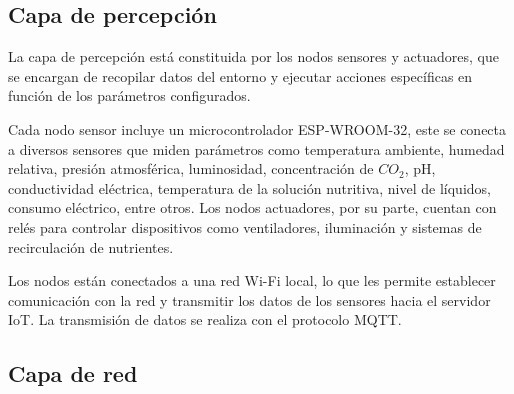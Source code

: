 
\subsection{Capa de percepción}

La capa de percepción está constituida por los nodos sensores y actuadores, que
se encargan de recopilar datos del entorno y ejecutar acciones específicas en
función de los parámetros configurados.

Cada nodo sensor incluye un microcontrolador ESP-WROOM-32, este se conecta a
diversos sensores que miden parámetros como temperatura ambiente, humedad
relativa, presión atmosférica, luminosidad, concentración de $CO_2$, pH,
conductividad eléctrica, temperatura de la solución nutritiva, nivel de
líquidos, consumo eléctrico, entre otros. Los nodos actuadores, por su parte,
cuentan con relés para controlar dispositivos como ventiladores, iluminación y
sistemas de recirculación de nutrientes.

Los nodos están conectados a una red Wi-Fi local, lo que les permite establecer
comunicación con la red y transmitir los datos de los sensores hacia el
servidor IoT. La transmisión de datos se realiza con el protocolo MQTT.


\subsection{Capa de red}

